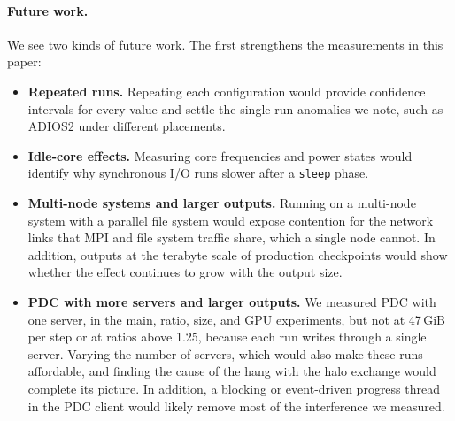 \paragraph{Future work.}
\label{sec:future}
We see two kinds of future work. The first strengthens the measurements in
this paper:
\begin{itemize}
  \item \textbf{Repeated runs.} Repeating each configuration would provide
        confidence intervals for every value and settle the single-run
        anomalies we note, such as ADIOS2 under different placements.
  \item \textbf{Idle-core effects.} Measuring core frequencies and power
        states would identify why synchronous I/O runs slower after a
        \texttt{sleep} phase.
  \item \textbf{Multi-node systems and larger outputs.} Running on a
        multi-node system with a parallel file system would expose
        contention for the network links that MPI and file system traffic
        share, which a single node cannot. In addition, outputs at the
        terabyte scale of production checkpoints would show whether the
        effect continues to grow with the output size.
  \item \textbf{PDC with more servers and larger outputs.} We measured PDC
        with one server, in the main, ratio, size, and GPU experiments, but
        not at 47\,GiB per step or at ratios above 1.25, because each run
        writes through a single server. Varying the number of servers,
        which would also make these runs affordable, and finding the cause
        of the hang with the halo exchange would complete its picture. In
        addition, a blocking or event-driven progress thread in the PDC client would likely remove most of the
        interference we measured.
\end{itemize}

